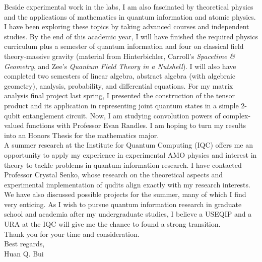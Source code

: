 \documentclass[12pt]{article}
\begin{document}
Beside experimental work in the labs,  I am also fascinated by theoretical physics and the applications of mathematics in quantum information and atomic physics. I have been exploring these topics by taking advanced courses and independent studies. By the end of this academic year, I will have finished the required physics curriculum plus a semester of quantum information and four on classical field theory-massive gravity (material from Hinterbichler\cite{RevModPhys.84.671}, Carroll's \textit{Spacetime \& Geometry}, and Zee's \textit{Quantum Field Theory in a Nutshell}). I will also have completed two semesters of linear algebra, abstract algebra (with algebraic geometry), analysis, probability, and differential equations. For my matrix analysis final project last spring, I presented the construction of the tensor product and its application in representing joint quantum states in a simple 2-qubit entanglement circuit. Now, I am studying convolution powers of complex-valued functions with Professor Evan Randles. I am hoping to turn my results into an Honors Thesis for the mathematics major. \\

  
A summer research at the Institute for Quantum Computing (IQC) offers me an opportunity to apply my experience in experimental AMO physics and interest in theory to tackle problems in quantum information research. I have contacted Professor Crystal Senko, whose research on the theoretical aspects and experimental implementation of qudits align exactly with my research interests. We have also discussed possible projects for the summer, many of which I find very enticing. As I wish to pursue quantum information research in graduate school and academia after my undergraduate studies, I believe a USEQIP and a URA at the IQC will give me the chance to found a strong transition.\\

\noindent Thank you for your time and consideration. \\



\noindent Best regards,\\
\noindent Huan Q. Bui













 









	
	
	
	
	
\end{document}
